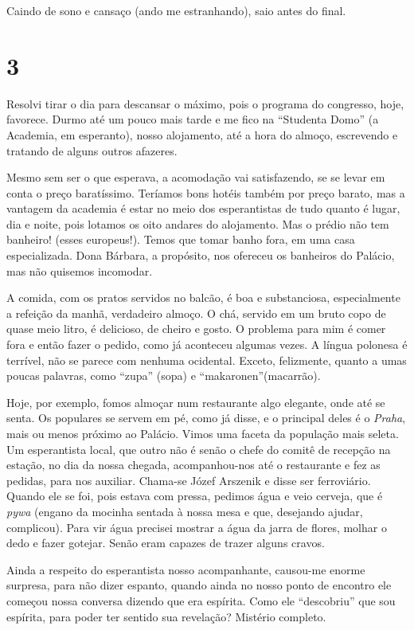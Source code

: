 Caindo de sono e cansaço (ando me estranhando), saio antes do final.

\section*{3 \adfflatleafright {}}
Resolvi tirar o dia para descansar o máximo, pois o programa do congresso, hoje, favorece. Durmo até um pouco mais tarde e me fico na ``Studenta Domo'' (a Academia, em esperanto), nosso alojamento, até a hora do almoço, escrevendo e tratando de alguns outros afazeres.

Mesmo sem ser o que esperava, a acomodação vai satisfazendo, se se levar em conta o preço baratíssimo. Teríamos bons hotéis também por preço barato, mas a vantagem da academia é estar no meio dos esperantistas de tudo quanto é lugar, dia e noite, pois lotamos os oito andares do alojamento. Mas o prédio não tem banheiro! (esses europeus!). Temos que tomar banho fora, em uma casa especializada. Dona Bárbara, a propósito, nos ofereceu os banheiros do Palácio, mas não quisemos incomodar.

A comida, com os pratos servidos no balcão, é boa e substanciosa, especialmente a refeição da manhã, verdadeiro almoço. O chá, servido em um bruto copo de quase meio litro, é delicioso, de cheiro e gosto. O problema para mim é comer fora e então fazer o pedido, como já aconteceu algumas vezes. A língua polonesa é terrível, não se parece com nenhuma ocidental. Exceto, felizmente, quanto a umas poucas palavras, como ``zupa'' (sopa) e ``makaronen''(macarrão).

Hoje, por exemplo, fomos almoçar num restaurante algo elegante, onde até se senta. Os populares se servem em pé, como já disse, e o principal deles é o \textit{Praha}, mais ou menos próximo ao Palácio. Vimos uma faceta da população mais seleta. Um esperantista local, que outro não é senão o chefe do comitê de recepção na estação, no dia da nossa chegada, acompanhou-nos até o restaurante e fez as pedidas, para nos auxiliar. Chama-se Józef Arszenik e disse ser ferroviário. Quando ele se foi, pois estava com pressa, pedimos água e veio cerveja, que é \textit{pywa} (engano da mocinha sentada à nossa mesa e que, desejando ajudar, complicou). Para vir água precisei mostrar a água da jarra de flores, molhar o dedo e fazer gotejar. Senão eram capazes de trazer alguns cravos.

Ainda a respeito do esperantista nosso acompanhante, causou-me enorme surpresa, para não dizer espanto, quando ainda no nosso ponto de encontro ele começou nossa conversa dizendo que era espírita. Como ele ``descobriu'' que sou espírita, para poder ter sentido sua revelação? Mistério completo.

